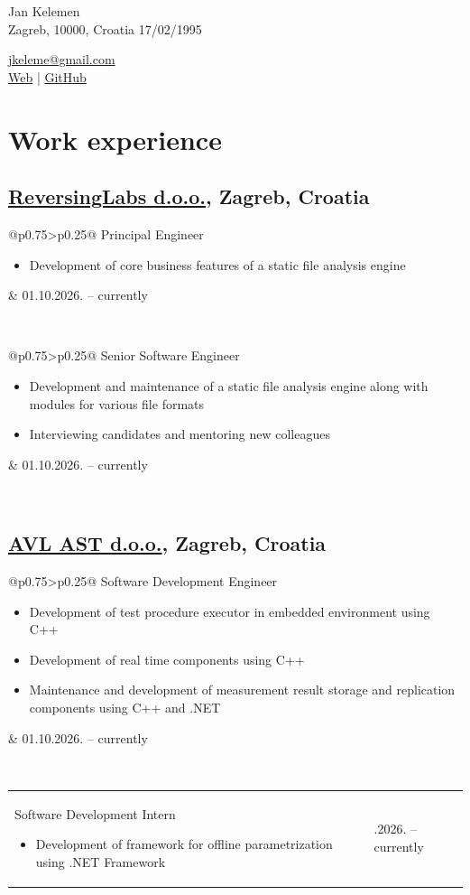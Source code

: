 \documentclass[a4paper]{article}
\makeatletter
\newlength{\tablewidth}
\newenvironment{period}[2]{%
\newcommand{\sarma}{#2}%
\setlength{\tablewidth}{\linewidth}
\addtolength{\tablewidth}{-2\tabcolsep}
\begin{tabular}{@{}p{0.75\tablewidth}>{\raggedleft\arraybackslash}p{0.25\tablewidth}@{}}%
#1 \newline
\begin{itemize}
}{%
\end{itemize} & \sarma \\%
\end{tabular}\\
}
\makeatother
\begin{document}
\fontfamily{\sfdefault}
\selectfont

\begin{minipage}{.5\textwidth}
\LARGE{Jan Kelemen}\\
\normalsize{Zagreb, 10000, Croatia}
\normalsize{17/02/1995}
\end{minipage}%
\begin{minipage}{.5\textwidth}
\raggedleft
\href{mailto:jkeleme@gmail.com}{jkeleme@gmail.com} \\
\href{http://jan-kelemen.github.io/}{Web} | \href{https://github.com/jan-kelemen}{GitHub}
\end{minipage}

\vspace{1em}

\section{Work experience}
\subsection{\href{https://www.reversinglabs.com/}{ReversingLabs d.o.o.}, Zagreb, Croatia}
\begin{period}{Principal Engineer}{01.10.2026. -- currently}
    \item 
        Development of core business features of a static file analysis engine
\end{period}
\begin{period}{Senior Software Engineer}{08.01.2024. -- 30.09.2026.}
    \item 
        Development and maintenance of a static file analysis engine along with modules for various file formats
    \item 
        Interviewing candidates and mentoring new colleagues
\end{period}
\subsection{\href{https://www.avl.com/}{AVL AST d.o.o.}, Zagreb, Croatia}
\begin{period}{Software Development Engineer}{01.08.2018. -- 31.12.2023.}
    \item
        Development of test procedure executor in embedded environment using C++
    \item
        Development of real time components using C++
    \item
        Maintenance and development of measurement result storage and replication components using C++ and .NET
\end{period}
\begin{period}{Software Development Intern}{17.07.2017. -- 31.07.2018.}
    \item
        Development of framework for offline parametrization using .NET Framework
\end{period}
\end{document}
